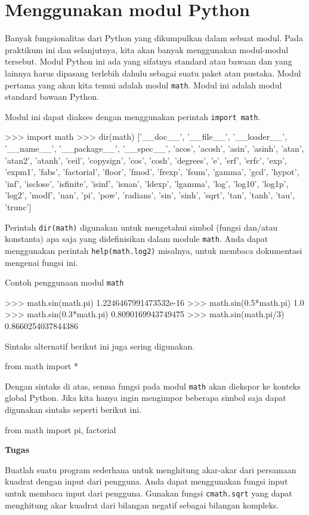 \section{Menggunakan modul Python}

Banyak fungsionalitas dari Python yang dikumpulkan dalam sebuat modul.
Pada praktikum ini dan selanjutnya, kita akan banyak menggunakan modul-modul
tersebut.
Modul Python ini ada yang sifatnya standard atau bawaan dan yang lainnya
harus dipasang terlebih dahulu sebagai suatu paket atau pustaka.
Modul pertama yang akan kita temui adalah modul \texttt{math}. Modul ini
adalah modul standard bawaan Python.

Modul ini dapat diakses dengan menggunakan perintah \texttt{import math}.
\begin{pyconcode}
>>> import math
>>> dir(math)
['__doc__', '__file__', '__loader__', '__name__', '__package__', '__spec__', 'acos', 'acosh', 'asin', 'asinh', 'atan', 'atan2', 'atanh', 'ceil', 'copysign', 'cos', 'cosh', 'degrees', 'e', 'erf', 'erfc', 'exp', 'expm1', 'fabs', 'factorial', 'floor', 'fmod', 'frexp', 'fsum', 'gamma', 'gcd', 'hypot', 'inf', 'isclose', 'isfinite', 'isinf', 'isnan', 'ldexp', 'lgamma', 'log', 'log10', 'log1p', 'log2', 'modf', 'nan', 'pi', 'pow', 'radians', 'sin', 'sinh', 'sqrt', 'tan', 'tanh', 'tau', 'trunc']
\end{pyconcode}

Perintah \texttt{dir(math)} digunakan untuk mengetahui simbol
(fungsi dan/atau konstanta) apa saja yang
didefinisikan dalam module \texttt{math}. Anda dapat menggunakan perintah
\texttt{help(math.log2)} misalnya, untuk membaca dokumentasi mengenai fungsi ini.

Contoh penggunaan modul \texttt{math}
\begin{pyconcode}
>>> math.sin(math.pi)
1.2246467991473532e-16
>>> math.sin(0.5*math.pi)
1.0
>>> math.sin(0.3*math.pi)
0.8090169943749475
>>> math.sin(math.pi/3)
0.8660254037844386
\end{pyconcode}

Sintaks alternatif berikut ini juga sering digunakan.
\begin{pythoncode}
from math import *
\end{pythoncode}
Dengan sintaks di atas, semua fungsi pada modul \texttt{math} akan diekspor ke
konteks global Python.
Jika kita hanya ingin mengimpor beberapa simbol saja dapat digunakan
sintaks seperti berikut ini.
\begin{pythoncode}
from math import pi, factorial
\end{pythoncode}


\begin{mdframed}[backgroundcolor=myframebg]
\textbf{Tugas}

Buatlah suatu program sederhana untuk menghitung akar-akar dari
persamaan kuadrat dengan input dari pengguna. Anda dapat menggunakan
fungsi input untuk membaca input dari pengguna. Gunakan fungsi
\texttt{cmath.sqrt} yang dapat menghitung akar kuadrat dari bilangan
negatif sebagai bilangan kompleks.
\end{mdframed}

